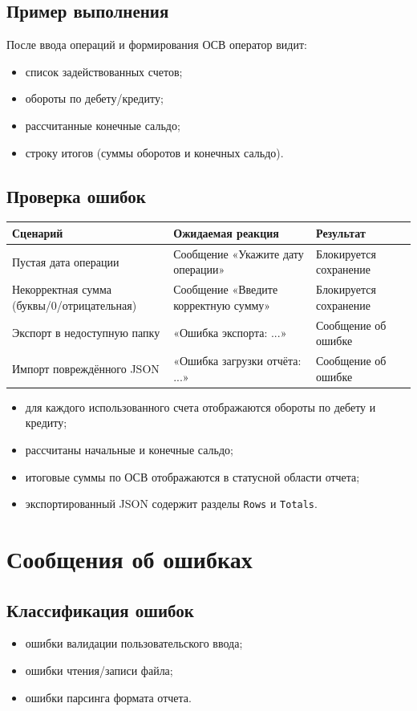 \documentclass[14pt,a4paper]{extarticle}
\begin{document}
\subsection{Пример выполнения}
После ввода операций и формирования ОСВ оператор видит:
\begin{itemize}
    \item список задействованных счетов;
    \item обороты по дебету/кредиту;
    \item рассчитанные конечные сальдо;
    \item строку итогов (суммы оборотов и конечных сальдо).
\end{itemize}

\subsection{Проверка ошибок}
\begin{longtable}{|p{6.3cm}|p{4.7cm}|p{4.0cm}|}
\hline
\textbf{Сценарий} & \textbf{Ожидаемая реакция} & \textbf{Результат} \\
\hline
Пустая дата операции & Сообщение «Укажите дату операции» & Блокируется сохранение \\
\hline
Некорректная сумма (буквы/0/отрицательная) & Сообщение «Введите корректную сумму» & Блокируется сохранение \\
\hline
Экспорт в недоступную папку & «Ошибка экспорта: ...» & Сообщение об ошибке \\
\hline
Импорт повреждённого JSON & «Ошибка загрузки отчёта: ...» & Сообщение об ошибке \\
\hline
\end{longtable}
\begin{itemize}
    \item для каждого использованного счета отображаются обороты по дебету и кредиту;
    \item рассчитаны начальные и конечные сальдо;
    \item итоговые суммы по ОСВ отображаются в статусной области отчета;
    \item экспортированный JSON содержит разделы \texttt{Rows} и \texttt{Totals}.
\end{itemize}

\section{Сообщения об ошибках}

\subsection{Классификация ошибок}
\begin{itemize}
    \item ошибки валидации пользовательского ввода;
    \item ошибки чтения/записи файла;
    \item ошибки парсинга формата отчета.
\end{itemize}
\end{document}
